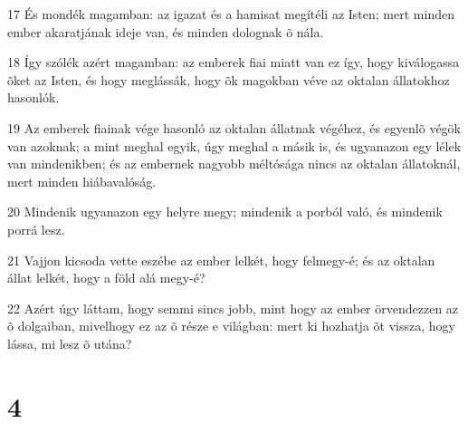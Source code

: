 \par 17 És mondék magamban: az igazat és a hamisat megítéli az Isten; mert minden ember akaratjának ideje van, és minden dolognak õ nála.
\par 18 Így szólék azért magamban: az emberek fiai miatt van ez így, hogy kiválogassa õket az Isten, és hogy meglássák, hogy õk magokban véve az oktalan állatokhoz hasonlók.
\par 19 Az emberek fiainak vége hasonló az oktalan állatnak végéhez, és egyenlõ végök van azoknak; a mint meghal egyik, úgy meghal a másik is, és ugyanazon egy lélek van mindenikben; és az embernek nagyobb méltósága nincs az oktalan állatoknál, mert minden hiábavalóság.
\par 20 Mindenik ugyanazon egy helyre megy; mindenik a porból való, és mindenik porrá lesz.
\par 21 Vajjon kicsoda vette eszébe az ember lelkét, hogy felmegy-é; és az oktalan állat lelkét, hogy a föld alá megy-é?
\par 22 Azért úgy láttam, hogy semmi sincs jobb, mint hogy az ember örvendezzen az õ dolgaiban, mivelhogy ez az õ része e világban: mert ki hozhatja õt vissza, hogy lássa, mi lesz õ utána?

\chapter{4}

